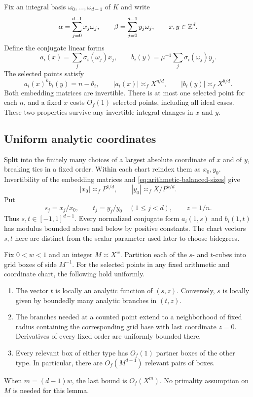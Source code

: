 Fix an integral basis $\omega_0,\ldots,\omega_{d-1}$ of $K$ and write
\[
 \alpha=\sum_{j=0}^{d-1}x_j\omega_j,\qquad
 \beta=\sum_{j=0}^{d-1}y_j\omega_j,\qquad x,y\in\mathbb Z^d.
\]
Define the conjugate linear forms
\[
 a_i(x)=\sum_j\sigma_i(\omega_j)x_j,\qquad
 b_i(y)=\mu^{-1}\sum_j\sigma_i(\omega_j)y_j.
\]
The selected points satisfy
\begin{equation}\label{eq:arithmetic-conjugate-equations}
 a_i(x)^k b_i(y)=n-\theta_i,\qquad
 |a_i(x)|\asymp_f X^{\eta/d},\qquad
 |b_i(y)|\asymp_f X^{b/d}.
\end{equation}
Both embedding matrices are invertible.  There is at most one selected
point for each $n$, and a fixed $x$ costs $O_f(1)$ selected points,
including all ideal cases.  These two properties survive any invertible
integral changes in $x$ and $y$.

\subsection{Uniform analytic coordinates}

Split into the finitely many choices of a largest absolute coordinate
of $x$ and of $y$, breaking ties in a fixed order.  Within each chart
reindex them as $x_0,y_0$.  Invertibility of the embedding matrices and
\eqref{eq:arithmetic-balanced-sizes} give
\[
 |x_0|\asymp_f P^{1/d},\qquad
 |y_0|\asymp_f X/P^{k/d}.
\]
Put
\[
 s_j=x_j/x_0,\qquad t_j=y_j/y_0\quad(1\le j<d),
 \qquad z=1/n.
\]
Thus $s,t\in[-1,1]^{d-1}$.  Every normalized conjugate form
$a_i(1,s)$ and $b_i(1,t)$ has modulus bounded above and below by
positive constants.  The chart vectors $s,t$ here are distinct from the
scalar parameter used later to choose bidegrees.

\begin{lemma}\label{lem:paired-boxes}
Fix $0<w<1$ and an integer $M\asymp X^w$.  Partition each of the
$s$- and $t$-cubes into grid boxes of side $M^{-1}$.  For the selected
points in any fixed arithmetic and coordinate chart, the following
hold uniformly.
\begin{enumerate}
\item The vector $t$ is locally an analytic function of $(s,z)$.
Conversely, $s$ is locally given by boundedly many analytic branches in
$(t,z)$.
\item The branches needed at a counted point extend to a neighborhood
of fixed radius containing the corresponding grid base with last
coordinate $z=0$.  Derivatives of every fixed order are uniformly
bounded there.
\item Every relevant box of either type has $O_f(1)$ partner boxes of
the other type.  In particular, there are $O_f(M^{d-1})$ relevant
pairs of boxes.
\end{enumerate}
When $m=(d-1)w$, the last bound is $O_f(X^m)$.  No primality assumption
on $M$ is needed for this lemma.
\end{lemma}

